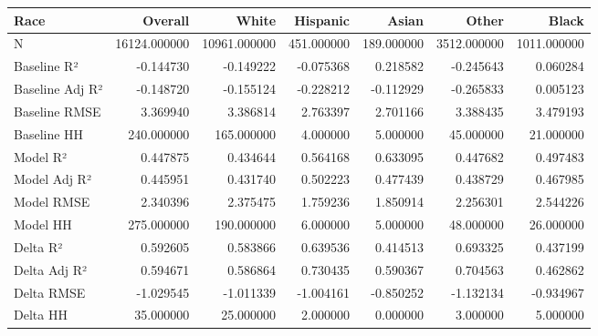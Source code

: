 \begin{tabular}{lrrrrrr}
\toprule
Race &       Overall &         White &    Hispanic &       Asian &        Other &        Black \\
\midrule
N               &  16124.000000 &  10961.000000 &  451.000000 &  189.000000 &  3512.000000 &  1011.000000 \\
Baseline R²     &     -0.144730 &     -0.149222 &   -0.075368 &    0.218582 &    -0.245643 &     0.060284 \\
Baseline Adj R² &     -0.148720 &     -0.155124 &   -0.228212 &   -0.112929 &    -0.265833 &     0.005123 \\
Baseline RMSE   &      3.369940 &      3.386814 &    2.763397 &    2.701166 &     3.388435 &     3.479193 \\
Baseline HH     &    240.000000 &    165.000000 &    4.000000 &    5.000000 &    45.000000 &    21.000000 \\
Model R²        &      0.447875 &      0.434644 &    0.564168 &    0.633095 &     0.447682 &     0.497483 \\
Model Adj R²    &      0.445951 &      0.431740 &    0.502223 &    0.477439 &     0.438729 &     0.467985 \\
Model RMSE      &      2.340396 &      2.375475 &    1.759236 &    1.850914 &     2.256301 &     2.544226 \\
Model HH        &    275.000000 &    190.000000 &    6.000000 &    5.000000 &    48.000000 &    26.000000 \\
Delta R²        &      0.592605 &      0.583866 &    0.639536 &    0.414513 &     0.693325 &     0.437199 \\
Delta Adj R²    &      0.594671 &      0.586864 &    0.730435 &    0.590367 &     0.704563 &     0.462862 \\
Delta RMSE      &     -1.029545 &     -1.011339 &   -1.004161 &   -0.850252 &    -1.132134 &    -0.934967 \\
Delta HH        &     35.000000 &     25.000000 &    2.000000 &    0.000000 &     3.000000 &     5.000000 \\
\bottomrule
\end{tabular}
